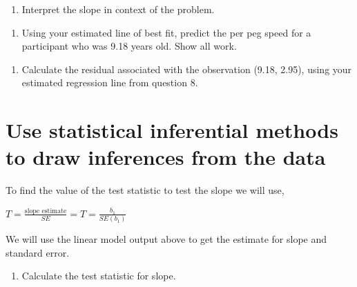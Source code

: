 \documentclass[
]{report}
\providecommand{\tightlist}{%
  \setlength{\itemsep}{0pt}\setlength{\parskip}{0pt}}
\begin{document}
\vspace{1in}

\begin{enumerate}
\def\labelenumi{\arabic{enumi}.}
\setcounter{enumi}{8}
\tightlist
\item
  Interpret the slope in context of the problem.
\end{enumerate}

\vspace{1in}

\begin{enumerate}
\def\labelenumi{\arabic{enumi}.}
\setcounter{enumi}{9}
\tightlist
\item
  Using your estimated line of best fit, predict the per peg speed for a participant who was 9.18 years old. Show all work.
\end{enumerate}

\vspace{1in}

\begin{enumerate}
\def\labelenumi{\arabic{enumi}.}
\setcounter{enumi}{10}
\tightlist
\item
  Calculate the residual associated with the observation (9.18, 2.95), using your estimated regression line from question 8.
\end{enumerate}

\vspace{1in}

\hypertarget{use-statistical-inferential-methods-to-draw-inferences-from-the-data}{%
\section{Use statistical inferential methods to draw inferences from the data}\label{use-statistical-inferential-methods-to-draw-inferences-from-the-data}}

To find the value of the test statistic to test the slope we will use,

\(T = \frac{\mbox{slope estimate}}{SE} = T = \frac{b_1}{SE(b_1)}\)

We will use the linear model output above to get the estimate for slope and standard error.

\begin{enumerate}
\def\labelenumi{\arabic{enumi}.}
\setcounter{enumi}{11}
\tightlist
\item
  Calculate the test statistic for slope.
\end{enumerate}

\vspace{1in}
\end{document}
